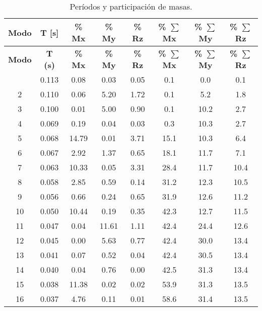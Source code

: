 \begin{longtable}{cccccccc}
\caption{Períodos y participación de masas.}\label{tabla-periodo-participacion}\\
\hline
\multicolumn{1}{c}{\textbf{Modo}} & \textbf{T [s]} & \textbf{\% Mx} & \textbf{\% My} & \textbf{\% Rz} & \textbf{\% \boldmath{}\textbf{$\sum$}\unboldmath{}Mx} & \textbf{\% \boldmath{}\textbf{$\sum$}\unboldmath{}My} & \textbf{\% \boldmath{}\textbf{$\sum$}\unboldmath{}Rz} \bigstrut\\
\hline
\endfirsthead
\hline
\multicolumn{1}{|c}{\textbf{Modo}} & \textbf{T (s)} & \textbf{\% Mx} & \textbf{\% My} & \textbf{\% Rz} & \textbf{\% \boldmath{}\textbf{$\sum$}\unboldmath{}Mx} & \textbf{\% \boldmath{}\textbf{$\sum$}\unboldmath{}My} & \textbf{\% \boldmath{}\textbf{$\sum$}\unboldmath{}Rz} \bigstrut\\
\hline
\endhead
\hline
\endfoot
\hline
\endlastfoot
1     & 0.113 & 0.08  & 0.03  & 0.05  & 0.1   & 0.0   & 0.1 \bigstrut[t]\\
    2     & 0.110 & 0.06  & 5.20  & 1.72  & 0.1   & 5.2   & 1.8 \\
    3     & 0.100 & 0.01  & 5.00  & 0.90  & 0.1   & 10.2  & 2.7 \\
    4     & 0.069 & 0.19  & 0.04  & 0.03  & 0.3   & 10.3  & 2.7 \\
    5     & 0.068 & 14.79 & 0.01  & 3.71  & 15.1  & 10.3  & 6.4 \\
    6     & 0.067 & 2.92  & 1.37  & 0.65  & 18.1  & 11.7  & 7.1 \\
    7     & 0.063 & 10.33 & 0.05  & 3.31  & 28.4  & 11.7  & 10.4 \\
    8     & 0.058 & 2.85  & 0.59  & 0.14  & 31.2  & 12.3  & 10.5 \\
    9     & 0.056 & 0.66  & 0.24  & 0.65  & 31.9  & 12.6  & 11.2 \\
    10    & 0.050 & 10.44 & 0.19  & 0.35  & 42.3  & 12.7  & 11.5 \\
    11    & 0.047 & 0.04  & 11.61 & 1.11  & 42.4  & 24.4  & 12.6 \\
    12    & 0.045 & 0.00  & 5.63  & 0.77  & 42.4  & 30.0  & 13.4 \\
    13    & 0.041 & 0.07  & 0.52  & 0.04  & 42.4  & 30.5  & 13.4 \\
    14    & 0.040 & 0.04  & 0.76  & 0.00  & 42.5  & 31.3  & 13.4 \\
    15    & 0.038 & 11.38 & 0.02  & 0.02  & 53.9  & 31.3  & 13.5 \\
    16    & 0.037 & 4.76  & 0.11  & 0.01  & 58.6  & 31.4  & 13.5 \\

\end{longtable}
